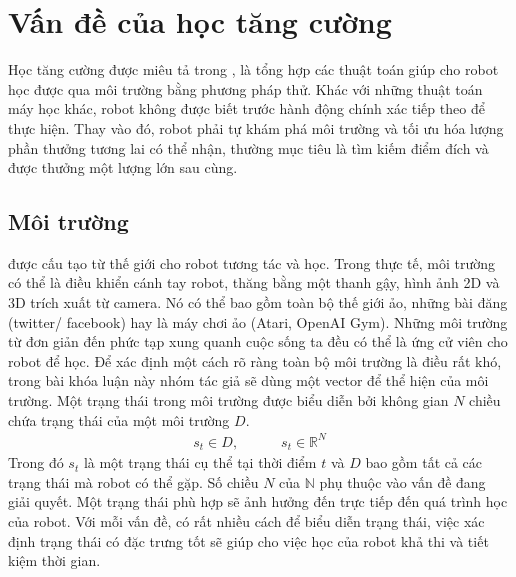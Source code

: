 \section{Vấn đề của học tăng cường}
Học tăng cường được miêu tả trong \cite{RLSuttonBook}, là tổng hợp các thuật toán giúp cho robot học được qua môi trường bằng phương pháp thử. Khác với những thuật toán máy học khác, robot không được biết trước hành động chính xác tiếp theo để thực hiện. Thay vào đó, robot phải tự khám phá môi trường và tối ưu hóa lượng phần thưởng tương lai có thể nhận, thường mục tiêu là tìm kiếm điểm đích và được thưởng một lượng lớn sau cùng.
\subsection{Môi trường}
được cấu tạo từ thế giới cho robot tương tác và học. Trong thực tế, môi trường có thể là điều khiển cánh tay robot, thăng bằng một thanh gậy, hình ảnh 2D và 3D trích xuất từ camera. Nó có thể bao gồm toàn bộ thế giới ảo, những bài đăng (twitter/ facebook) hay là máy chơi ảo (Atari, OpenAI Gym). Những môi trường từ đơn giản đến phức tạp xung quanh cuộc sống ta đều có thể là ứng cử viên cho robot để học. Để xác định một cách rõ ràng toàn bộ môi trường là điều rất khó, trong bài khóa luận này nhóm tác giả sẽ dùng một vector để thể hiện
 của môi trường. Một trạng thái trong môi trường được biểu diễn bởi không gian $N$ chiều chứa trạng thái của một môi trường $D$.
\begin{align*}
    s_t \in D,\quad\quad\quad s_t \in \mathbb{R}^N
\end{align*}
Trong đó $s_t$ là một trạng thái cụ thể tại thời điểm $t$ và $D$ bao gồm tất cả các trạng thái mà robot có thể gặp. Số chiều $N$ của $\mathbb{N}$ phụ thuộc vào vấn đề đang giải quyết. Một trạng thái phù hợp sẽ ảnh hưởng đến trực tiếp đến quá trình học của robot. Với mỗi vấn đề, có rất nhiều cách để biểu diễn trạng thái, việc xác định trạng thái có đặc trưng tốt sẽ giúp cho việc học của robot khả thi và tiết kiệm thời gian.
